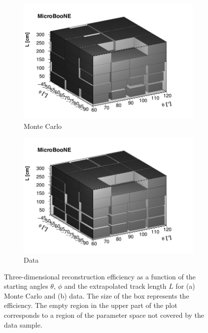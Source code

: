 \documentclass[a4paper,11pt]{article}
\begin{document}
\begin{figure}[htbp]
  \begin{subfigure}{0.495\textwidth}
    \includegraphics[width=\linewidth]{figures/3d_mc.png}
    \caption{Monte Carlo} \label{fig:3d_mc}
  \end{subfigure}
  \begin{subfigure}{0.495\textwidth}
    \includegraphics[width=\linewidth]{figures/3d_data.png}
    \caption{Data} \label{fig:3d_data}
  \end{subfigure}
  \caption{Three-dimensional reconstruction efficiency as a function of the starting angles $\theta$, $\phi$ and the extrapolated track length $L$ for (a) Monte Carlo and (b) data. The size of the box represents the efficiency. The empty region in the upper part of the plot corresponds to a region of the parameter space not covered by the data sample.}\label{fig:3d}
\end{figure}
\end{document}
